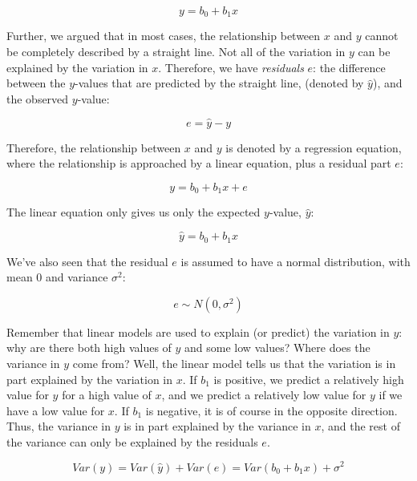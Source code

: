 \documentclass[]{report}\usepackage[]{graphicx}\usepackage[]{color}
\begin{document}
\begin{equation}
y = b_0 + b_1 x
\end{equation}

Further, we argued that in most cases, the relationship between $x$ and $y$ cannot be completely described by a straight line. Not all of the variation in $y$ can be explained by the variation in $x$. Therefore, we have \textit{residuals} $e$: the difference between the $y$-values that are predicted by the straight line, (denoted by $\hat{y}$), and the observed $y$-value:

\begin{equation}
e = \hat{y} - y
\end{equation}

Therefore, the relationship between $x$ and $y$ is denoted by a regression equation, where the relationship is approached by a linear equation, plus a residual part $e$:

\begin{equation}
y = b_0 + b_1 x + e
\end{equation}

The linear equation only gives us only the expected $y$-value, $\hat{y}$:


\begin{equation}
\hat{y} = b_0 + b_1 x
\end{equation}


We've also seen that the residual $e$ is assumed to have a normal distribution, with mean 0 and variance $\sigma^2$:


\begin{equation}
e \sim N(0,\sigma^2)
\end{equation}

Remember that linear models are used to explain (or predict) the variation in $y$: why are there both high values of $y$ and some low values? Where does the variance in $y$ come from? Well, the linear model tells us that the variation is in part explained by the variation in $x$. If $b_1$ is positive, we predict a relatively high value for $y$ for a high value of $x$, and we predict a relatively low value for $y$ if we have a low value for $x$. If $b_1$ is negative, it is of course in the opposite direction. Thus, the variance in $y$ is in part explained by the variance in $x$, and the rest of the variance can only be explained by the residuals $e$.



\begin{equation}
Var(y) = Var(\hat{y}) + Var(e) = Var(b_0 + b_1 x) + \sigma^2
\end{equation}
\end{document}
